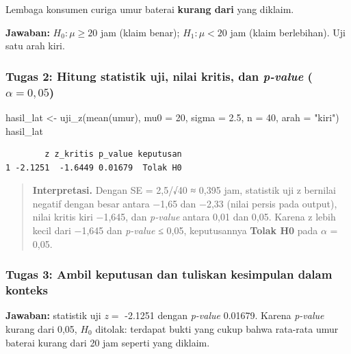 \documentclass[
  indonesian,
  letterpaper,
]{book}
\newenvironment{Shaded}{\begin{snugshade}}{\end{snugshade}}
\newcommand{\AttributeTok}[1]{\textcolor[rgb]{0.40,0.45,0.13}{#1}}
\newcommand{\DecValTok}[1]{\textcolor[rgb]{0.68,0.00,0.00}{#1}}
\newcommand{\FloatTok}[1]{\textcolor[rgb]{0.68,0.00,0.00}{#1}}
\newcommand{\FunctionTok}[1]{\textcolor[rgb]{0.28,0.35,0.67}{#1}}
\newcommand{\NormalTok}[1]{\textcolor[rgb]{0.00,0.23,0.31}{#1}}
\newcommand{\OtherTok}[1]{\textcolor[rgb]{0.00,0.23,0.31}{#1}}
\newcommand{\StringTok}[1]{\textcolor[rgb]{0.13,0.47,0.30}{#1}}
\begin{document}
Lembaga konsumen curiga umur baterai \textbf{kurang dari} yang diklaim.

\textbf{Jawaban:} \(H_0: \mu \ge 20\) jam (klaim benar);
\(H_1: \mu < 20\) jam (klaim berlebihan). Uji satu arah kiri.

\subsubsection{\texorpdfstring{Tugas 2: Hitung statistik uji, nilai
kritis, dan \emph{p-value}
(\(\alpha = 0{,}05\))}{Tugas 2: Hitung statistik uji, nilai kritis, dan p-value (\textbackslash alpha = 0\{,\}05)}}\label{tugas-2-hitung-statistik-uji-nilai-kritis-dan-p-value-alpha-005}

\begin{Shaded}
\begin{Highlighting}[]
\NormalTok{hasil\_lat }\OtherTok{\textless{}{-}} \FunctionTok{uji\_z}\NormalTok{(}\FunctionTok{mean}\NormalTok{(umur), }\AttributeTok{mu0 =} \DecValTok{20}\NormalTok{, }\AttributeTok{sigma =} \FloatTok{2.5}\NormalTok{, }\AttributeTok{n =} \DecValTok{40}\NormalTok{, }\AttributeTok{arah =} \StringTok{"kiri"}\NormalTok{)}
\NormalTok{hasil\_lat}
\end{Highlighting}
\end{Shaded}

\begin{verbatim}
        z z_kritis p_value keputusan
1 -2.1251  -1.6449 0.01679  Tolak H0
\end{verbatim}

\begin{quote}
\textbf{Interpretasi.} Dengan SE = 2,5/√40 ≈ 0,395 jam, statistik uji z
bernilai negatif dengan besar antara −1,65 dan −2,33 (nilai persis pada
output), nilai kritis kiri −1,645, dan \emph{p-value} antara 0,01 dan
0,05. Karena z lebih kecil dari −1,645 dan \emph{p-value} ≤ 0,05,
keputusannya \textbf{Tolak H0} pada \(\alpha\) = 0,05.
\end{quote}

\subsubsection{Tugas 3: Ambil keputusan dan tuliskan kesimpulan dalam
konteks}\label{tugas-3-ambil-keputusan-dan-tuliskan-kesimpulan-dalam-konteks}

\textbf{Jawaban:} statistik uji \(z =\) -2.1251 dengan \emph{p-value}
0.01679. Karena \emph{p-value} kurang dari 0,05, \(H_0\) ditolak:
terdapat bukti yang cukup bahwa rata-rata umur baterai kurang dari 20
jam seperti yang diklaim.
\end{document}
